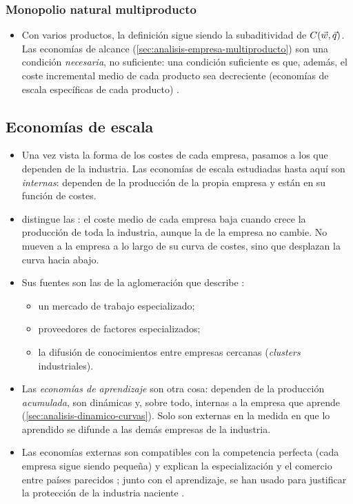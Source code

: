 \documentclass[11pt]{article}
\begin{document}
\subsubsection{Monopolio natural multiproducto}\label{sec:monopolio-natural-multiproducto}

\begin{itemize}
\item Con varios productos, la definición sigue siendo la subaditividad de $C(\vec{w},\vec{q})$. Las economías de alcance (\ref{sec:analisis-empresa-multiproducto}) son una condición \emph{necesaria}, no suficiente: una condición suficiente es que, además, el coste incremental medio de cada producto sea decreciente (economías de escala específicas de cada producto)\nocite{BaumolPanzarWillig1982Contestable} .
\end{itemize}

\subsection{Economías de escala}\label{sec:economias-escala}

\begin{itemize}
\item Una vez vista la forma de los costes de cada empresa, pasamos a los que dependen de la industria. Las economías de escala estudiadas hasta aquí son \emph{internas}: dependen de la producción de la propia empresa y están en su función de costes.
\item \textcite{Marshall1890Principles} distingue las : el coste medio de cada empresa baja cuando crece la producción de toda la industria, aunque la de la empresa no cambie. No mueven a la empresa a lo largo de su curva de costes, sino que desplazan la curva hacia abajo.
\item Sus fuentes son las de la aglomeración que describe :
  \begin{itemize}
  \item un mercado de trabajo especializado;
  \item proveedores de factores especializados;
  \item la difusión de conocimientos entre empresas cercanas (\emph{clusters} industriales).
  \end{itemize}
\item Las \emph{economías de aprendizaje} son otra cosa: dependen de la producción \emph{acumulada}, son dinámicas y, sobre todo, internas a la empresa que aprende (\ref{sec:analisis-dinamico-curvas}). Solo son externas en la medida en que lo aprendido se difunde a las demás empresas de la industria.
\item Las economías externas son compatibles con la competencia perfecta (cada empresa sigue siendo pequeña) y explican la especialización y el comercio entre países parecidos ; junto con el aprendizaje, se han usado para justificar la protección de la industria naciente .
\end{itemize}
\end{document}
